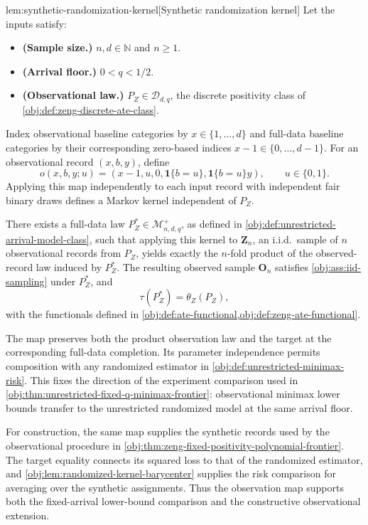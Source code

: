 \begin{lemmav}{lem:synthetic-randomization-kernel}[Synthetic randomization kernel]
Let the inputs satisfy:
\begin{itemize}
\item \textbf{(Sample size.)} \(n,d\in\mathbb N\) and \(n\ge1\).
\item \textbf{(Arrival floor.)} \(0<q<1/2\).
\item \textbf{(Observational law.)} \(P_Z\in\mathcal D_{d,q}\), the discrete positivity class of \cref{obj:def:zeng-discrete-ate-class}.
\end{itemize}
Index observational baseline categories by \(x\in\{1,\ldots,d\}\) and full-data baseline categories by their corresponding zero-based indices \(x-1\in\{0,\ldots,d-1\}\). For an observational record \((x,b,y)\), define
\[
o(x,b,y;u)
=
\left(x-1,u,0,\mathbf 1\{b=u\},\mathbf 1\{b=u\}y\right),
\qquad u\in\{0,1\}.
\]
Applying this map independently to each input record with independent fair binary draws defines a Markov kernel independent of \(P_Z\).

There exists a full-data law \(P_Z^*\in\mathcal M^{+}_{n,d,q}\), as defined in \cref{obj:def:unrestricted-arrival-model-class}, such that applying this kernel to \(\mathbf Z_n\), an i.i.d.\ sample of \(n\) observational records from \(P_Z\), yields exactly the \(n\)-fold product of the observed-record law induced by \(P_Z^*\). The resulting observed sample \(\mathbf O_n\) satisfies \cref{obj:ass:iid-sampling} under \(P_Z^*\), and
\[
\tau(P_Z^*)=\theta_Z(P_Z),
\]
with the functionals defined in \cref{obj:def:ate-functional,obj:def:zeng-ate-functional}.
\end{lemmav}

The map preserves both the product observation law and the target at the corresponding full-data completion. Its parameter independence permits composition with any randomized estimator in \cref{obj:def:unrestricted-minimax-risk}. This fixes the direction of the experiment comparison used in \cref{obj:thm:unrestricted-fixed-q-minimax-frontier}: observational minimax lower bounds transfer to the unrestricted randomized model at the same arrival floor.

For construction, the same map supplies the synthetic records used by the observational procedure in \cref{obj:thm:zeng-fixed-positivity-polynomial-frontier}. The target equality connects its squared loss to that of the randomized estimator, and \cref{obj:lem:randomized-kernel-barycenter} supplies the risk comparison for averaging over the synthetic assignments. Thus the observation map supports both the fixed-arrival lower-bound comparison and the constructive observational extension.
